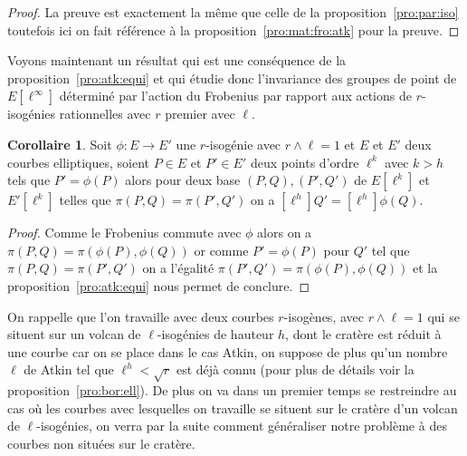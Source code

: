 \documentclass[10pt,a4paper]{book}
\theoremstyle{plain}
\theoremstyle{definition}
\theoremstyle{definition}
\newtheorem{cor}[thm]{Corollaire}
\theoremstyle{definition}
\theoremstyle{definition}
\theoremstyle{remark}
\theoremstyle{remark}
\theoremstyle{definition}
\begin{document}
\begin{proof}
La preuve est exactement la même que celle de la proposition~\ref{pro:par:iso}
toutefois ici on fait référence à la proposition~\ref{pro:mat:fro:atk} pour la
preuve.
\end{proof}

Voyons maintenant un résultat qui est une conséquence de la 
proposition~\ref{pro:atk:equi} et qui étudie donc l'invariance des groupes 
de point de $E[\ell^{\infty}]$ déterminé par l'action du Frobenius 
par rapport aux actions de $r$-isogénies rationnelles avec $r$ premier avec 
$\ell$.

\begin{cor}\label{cor:atk:ess}
Soit $\phi:E \rightarrow E'$ une $r$-isogénie avec $r \wedge \ell=1$ et $E$ et 
$E'$ deux courbes elliptiques, 
soient $P \in E$ et $P' \in E'$ deux points d'ordre $\ell^k$ avec $k>h$ tels 
que $P'=\phi(P)$ alors pour deux base $(P,Q),(P',Q')$ de $E[\ell^k]$ et 
$E'[\ell^k]$ telles que $\pi(P,Q)=\pi(P',Q')$ on a $[\ell^h]Q'=[\ell^h]\phi(Q)$. 
\end{cor}

\begin{proof}
Comme le Frobenius commute avec $\phi$ alors on a $\pi(P,Q)=\pi(\phi(P),\phi(Q))$
or comme $P'=\phi(P)$ pour $Q'$ tel que $\pi(P,Q)=\pi(P',Q')$ on a l'égalité 
$\pi(P',Q')=\pi(\phi(P),\phi(Q))$ et la proposition~\ref{pro:atk:equi} nous 
permet de conclure.
\end{proof}


On rappelle que l'on travaille avec deux courbes $r$-isogènes, avec $r \wedge 
\ell=1$ qui se situent sur un volcan de $\ell$-isogénies de hauteur $h$, dont 
le cratère est réduit à une courbe car on se place dans le cas Atkin, on 
suppose de plus qu'un nombre $\ell$ de Atkin tel que $\ell^h<\sqrt{r}$ est déjà
connu (pour plus de détails voir la proposition~\ref{pro:bor:ell}). De plus on 
va dans un premier temps se restreindre au cas où les courbes avec lesquelles 
on travaille se situent sur le cratère d'un volcan de $\ell$-isogénies, on 
verra par la suite comment généraliser notre problème à des courbes non situées
sur le cratère. 
\end{document}
